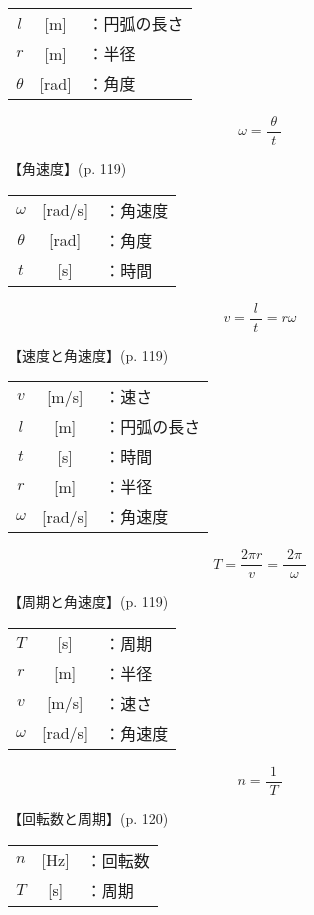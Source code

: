 \documentclass[10pt]{jarticle}
\begin{document}
\begin{tabular}{ccl}
$l$	&[m]	&：円弧の長さ\\
$r$	&[m]	&：半径\\
$\theta$	&[rad]	&：角度
\end{tabular}







\newpage
\[
\omega = \frac{\; \theta \;}{t}
\]


\vskip3mm
【角速度】{\footnotesize (p. 119)}

\begin{tabular}{ccl}
$\omega$	&[rad/s]	&：角速度\\
$\theta$	&[rad]	&：角度\\
$t$	&[s]	&：時間
\end{tabular}






\newpage
\[
v = \frac{\; l \;}{t} = r \omega
\]


\vskip3mm
【速度と角速度】{\footnotesize (p. 119)}

\begin{tabular}{ccl}
$v$	&[m/s]	&：速さ\\
$l$	&[m]	&：円弧の長さ\\
$t$	&[s]	&：時間\\
$r$	&[m]	&：半径\\
$\omega$	&[rad/s]	&：角速度\\
\end{tabular}




\newpage
\[
T = \frac{2\pi r}{v} = \frac{\; 2\pi \;}{\omega}
\]


\vskip3mm
【周期と角速度】{\footnotesize (p. 119)}

\begin{tabular}{ccl}
$T$	&[s]	&：周期\\
$r$	&[m]	&：半径\\
$v$	&[m/s]	&：速さ\\
$\omega$	&[rad/s]	&：角速度
\end{tabular}




\newpage
\[
n = \frac{1}{\; T \;}
\]


\vskip3mm
【回転数と周期】{\footnotesize (p. 120)}

\begin{tabular}{ccl}
$n$	& [Hz]	&：回転数\\
$T$	&[s]	&：周期
\end{tabular}
\end{document}
